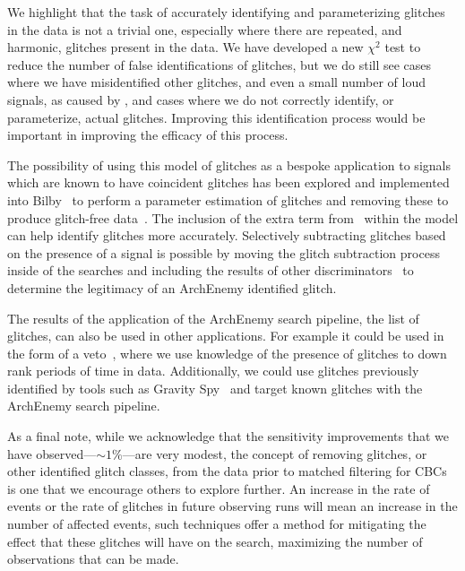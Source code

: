 We highlight that the task of accurately identifying and parameterizing \scl{} glitches in the data is not a trivial one, especially where there are repeated, and harmonic, glitches present in the data. We have developed a new $\chi^{2}$ test to reduce the number of false identifications of \scl{} glitches, but we do still see cases where we have misidentified other glitches, and even a small number of loud \gw{} signals, as caused by \scl, and cases where we do not correctly identify, or parameterize, actual \scl{} glitches. Improving this identification process would be important in improving the efficacy of this process.

The possibility of using this model of \scl{} glitches as a bespoke application to \gw{} signals which are known to have coincident \scl{} glitches has been explored and implemented into Bilby~\cite{BILBY:2019} to perform a parameter estimation of \scl{} glitches and removing these to produce glitch-free data~\cite{Udall:2023}. The inclusion of the extra term from~\cite{Was_Subtract:2021} within the model can help identify \scl{} glitches more accurately. Selectively subtracting glitches based on the presence of a \gw{} signal is possible by moving the glitch subtraction process inside of the \gw{} searches and including the results of other \gw{} discriminators~\cite{rw_snr_eq:2012, McIsaac_Chi:2022} to determine the legitimacy of an ArchEnemy identified glitch.

The results of the application of the ArchEnemy search pipeline, the list of \scl{} glitches, can also be used in other applications. For example it could be used in the form of a veto~\cite{O2O3_DetChar:2021}, where we use knowledge of the presence of \scl{} glitches to down rank periods of time in \gw{} data. Additionally, we could use \scl{} glitches previously identified by tools such as Gravity Spy~\cite{gravityspy:2023} and target known \scl{} glitches with the ArchEnemy search pipeline.

As a final note, while we acknowledge that the sensitivity improvements that we have observed---${\sim} 1\%$---are very modest, the concept of removing \scl{} glitches, or other identified glitch classes, from the data prior to matched filtering for CBCs is one that we encourage others to explore further. An increase in the rate of events or the rate of \scl{} glitches in future observing runs will mean an increase in the number of affected events, such techniques offer a method for mitigating the effect that these glitches will have on the search, maximizing the number of observations that can be made.
%
